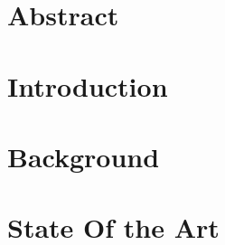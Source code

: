 \documentclass[english, a4paper, 12pt, twoside]{article}
\numberwithin{equation}{section} %
\def\biblio{\clearpage} %
\begin{document}
\def\biblio{} %


\restoregeometry %

\thispagestyle{plain} %
\clearpage\mbox{}\clearpage %

%     

\newpage
\section*{Abstract}
    

\newpage
\tableofcontents

\newpage
{ 
\listoffigures}
 
\newpage
{ 
\listoftables}

\newpage
{} %
\setcounter{page}{1} %
\setcounter{tocdepth}{0}

\section{Introduction} %
\clearpage %

\section{Background}
    
\clearpage


\section{State Of the Art}
    
\clearpage
  
\end{document}
